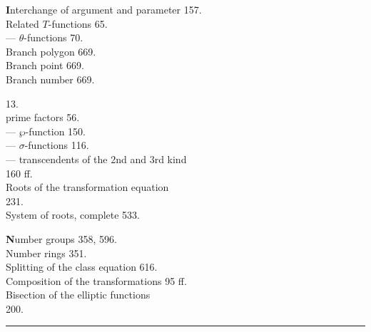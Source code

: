 \begin{minipage}[t]{0.48\textwidth}
\noindent \textbf{I}nterchange of argument and parameter 157.\\
Related $T$-functions 65.\\
--- $\theta$-functions 70.\\
Branch polygon 669.\\
Branch point 669.\\
Branch number 669.

\noindent {} 13.\\
 prime factors 56.\\
--- $\wp$-function 150.\\
--- $\sigma$-functions 116.\\
--- transcendents of the 2nd and 3rd kind\\
160 ff.\\
Roots of the transformation equation\\
231.\\
System of roots, complete 533.

\noindent \textbf{N}umber groups 358, 596.\\
Number rings 351.\\
Splitting of the class equation 616.\\
Composition of the transformations 95 ff.\\
Bisection of the elliptic functions\\
200.
\end{minipage}

\begin{center}
\rule{3cm}{0.4pt}
\end{center}
